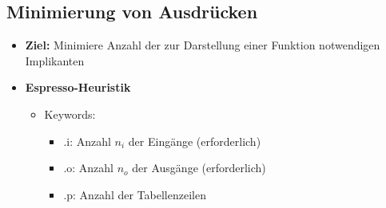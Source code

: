 \documentclass[11pt,a4paper]{article}
\begin{document}
\subsection{Minimierung von Ausdrücken}
\begin{itemize}

\item \textbf{Ziel:} Minimiere Anzahl der zur Darstellung einer Funktion notwendigen Implikanten

\item \textbf{Espresso-Heuristik}
	\begin{itemize}
	
	\item Keywords:
		\begin{itemize}
		\item .i: Anzahl $n_i$ der Eingänge (erforderlich)
		\item .o: Anzahl $n_o$ der Ausgänge (erforderlich)
		\item .p: Anzahl der Tabellenzeilen
		\end{itemize}
	
	\end{itemize}

\end{itemize}
\end{document}
